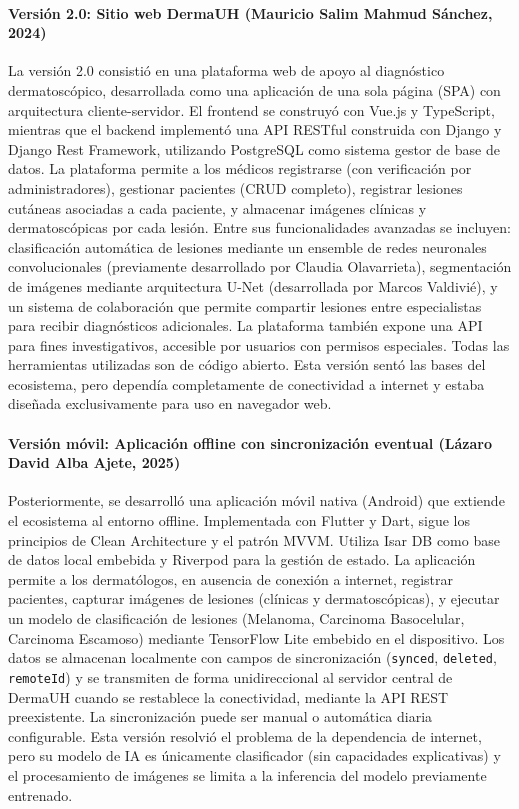 \paragraph{Versión 2.0: Sitio web DermaUH (Mauricio Salim Mahmud Sánchez, 2024)}
La versión 2.0 consistió en una plataforma web de apoyo al diagnóstico dermatoscópico, 
desarrollada como una aplicación de una sola página (SPA) con arquitectura cliente-servidor. 
El frontend se construyó con Vue.js y TypeScript, mientras que el backend implementó una API RESTful
construida con Django y Django Rest Framework, utilizando PostgreSQL como sistema gestor de base 
de datos. La plataforma permite a los médicos registrarse (con verificación por administradores), 
gestionar pacientes (CRUD completo), registrar lesiones cutáneas asociadas a cada paciente, y 
almacenar imágenes clínicas y dermatoscópicas por cada lesión. Entre sus funcionalidades avanzadas 
se incluyen: clasificación automática de lesiones mediante un ensemble de redes neuronales 
convolucionales (previamente desarrollado por Claudia Olavarrieta), segmentación de imágenes 
mediante arquitectura U-Net (desarrollada por Marcos Valdivié), y un sistema de colaboración 
que permite compartir lesiones entre especialistas para recibir diagnósticos adicionales. 
La plataforma también expone una API para fines investigativos, accesible por usuarios con 
permisos especiales. Todas las herramientas utilizadas son de código abierto. Esta versión sentó 
las bases del ecosistema, pero dependía completamente de conectividad a internet y estaba 
diseñada exclusivamente para uso en navegador web.

\paragraph{Versión móvil: Aplicación offline con sincronización eventual (Lázaro David Alba Ajete, 2025)}
Posteriormente, se desarrolló una aplicación móvil nativa (Android) que extiende el ecosistema 
al entorno offline. Implementada con Flutter y Dart, sigue los principios de Clean Architecture y 
el patrón MVVM. Utiliza Isar DB como base de datos local embebida y Riverpod para la gestión de estado. 
La aplicación permite a los dermatólogos, en ausencia de conexión a internet, registrar pacientes, 
capturar imágenes de lesiones (clínicas y dermatoscópicas), y ejecutar un modelo de clasificación 
de lesiones (Melanoma, Carcinoma Basocelular, Carcinoma Escamoso) mediante TensorFlow Lite embebido 
en el dispositivo. Los datos se almacenan localmente con campos de sincronización (\texttt{synced}, 
\texttt{deleted}, \texttt{remoteId}) y se transmiten de forma unidireccional al servidor central 
de DermaUH cuando se restablece la conectividad, mediante la API REST preexistente. 
La sincronización puede ser manual o automática diaria configurable. Esta versión resolvió el 
problema de la dependencia de internet, pero su modelo de IA es únicamente clasificador 
(sin capacidades explicativas) y el procesamiento de imágenes se limita a la inferencia del 
modelo previamente entrenado.

